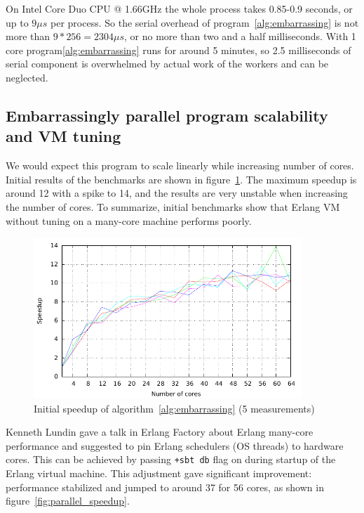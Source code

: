 \documentclass[english,11pt]{l4proj}
\begin{document}
On Intel Core Duo CPU @ 1.66GHz the whole process takes 0.85-0.9 seconds, or up
to $9\mu s$ per process. So the serial overhead of program~\ref{alg:embarrassing}
is not more than $9*256 = 2304 \mu s$, or no more than two and a half
milliseconds. With 1 core program\ref{alg:embarrassing} runs for around 5
minutes, so 2.5 milliseconds of serial component is overwhelmed by actual work
of the workers and can be neglected.

\subsection{Embarrassingly parallel program scalability and VM tuning}

We would expect this program to scale linearly while increasing number of cores.
Initial results of the benchmarks are shown in figure~\ref{fig:bad_speedup}.
The maximum speedup is around 12 with a spike to 14, and the results are very
unstable when increasing the number of cores. To summarize, initial benchmarks
show that Erlang VM without tuning on a many-core machine performs poorly.

\begin{figure}
    \centering
    \includegraphics[width=0.9\textwidth]{images/bad_speedup.pdf}
    \caption{Initial speedup of algorithm~\ref{alg:embarrassing} (5 measurements)}
    \label{fig:bad_speedup}
\end{figure}

Kenneth Lundin gave a talk in Erlang Factory\cite{lundin-smp} about Erlang
many-core performance and suggested to pin Erlang schedulers (OS threads) to
hardware cores. This can be achieved by passing {\tt +sbt db} flag on during
startup of the Erlang virtual machine. This adjustment gave significant
improvement: performance stabilized and jumped to around 37 for 56 cores, as
shown in figure~\ref{fig:parallel_speedup}.
\end{document}
